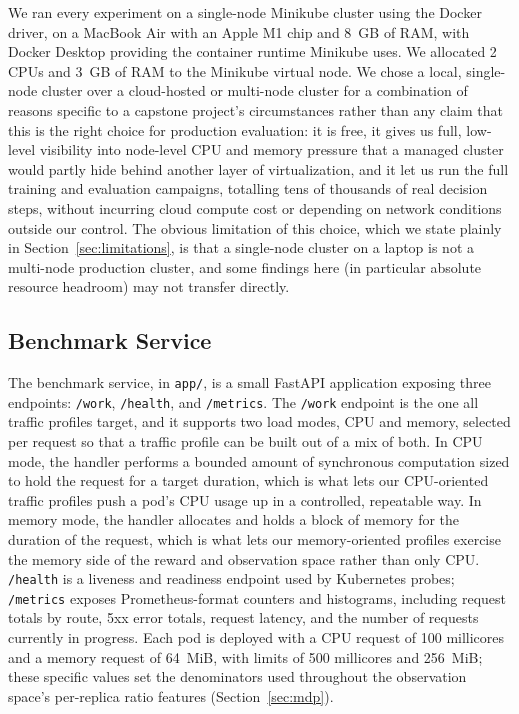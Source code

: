 We ran every experiment on a single-node Minikube cluster using the Docker
driver, on a MacBook Air with an Apple M1 chip and 8~GB of RAM, with Docker
Desktop providing the container runtime Minikube uses. We allocated 2 CPUs
and 3~GB of RAM to the Minikube virtual node. We chose a local, single-node
cluster over a cloud-hosted or multi-node cluster for a combination of
reasons specific to a capstone project's circumstances rather than any claim
that this is the right choice for production evaluation: it is free, it
gives us full, low-level visibility into node-level CPU and memory pressure
that a managed cluster would partly hide behind another layer of
virtualization, and it let us run the full training and evaluation
campaigns, totalling tens of thousands of real decision steps, without
incurring cloud compute cost or depending on network conditions outside our
control. The obvious limitation of this choice, which we state plainly in
Section~\ref{sec:limitations}, is that a single-node cluster on a laptop is
not a multi-node production cluster, and some findings here (in particular
absolute resource headroom) may not transfer directly.

\subsection{Benchmark Service}

The benchmark service, in \texttt{app/\allowbreak \allowbreak }, is a small FastAPI application
exposing three endpoints: \texttt{/\allowbreak \allowbreak work}, \texttt{/\allowbreak \allowbreak health}, and
\texttt{/\allowbreak \allowbreak metrics}. The \texttt{/\allowbreak \allowbreak work} endpoint is the one all traffic
profiles target, and it supports two load modes, CPU and memory, selected
per request so that a traffic profile can be built out of a mix of both.
In CPU mode, the handler performs a bounded amount of synchronous
computation sized to hold the request for a target duration, which is what
lets our CPU-oriented traffic profiles push a pod's CPU usage up in a
controlled, repeatable way. In memory mode, the handler allocates and holds
a block of memory for the duration of the request, which is what lets our
memory-oriented profiles exercise the memory side of the reward and
observation space rather than only CPU. \texttt{/\allowbreak \allowbreak health} is a liveness and
readiness endpoint used by Kubernetes probes; \texttt{/\allowbreak \allowbreak metrics} exposes
Prometheus-format counters and histograms, including request totals by
route, 5xx error totals, request latency, and the number of requests
currently in progress. Each pod is deployed with a CPU request of 100
millicores and a memory request of 64~MiB, with limits of 500 millicores
and 256~MiB; these specific values set the denominators used throughout the
observation space's per-replica ratio features (Section~\ref{sec:mdp}).

